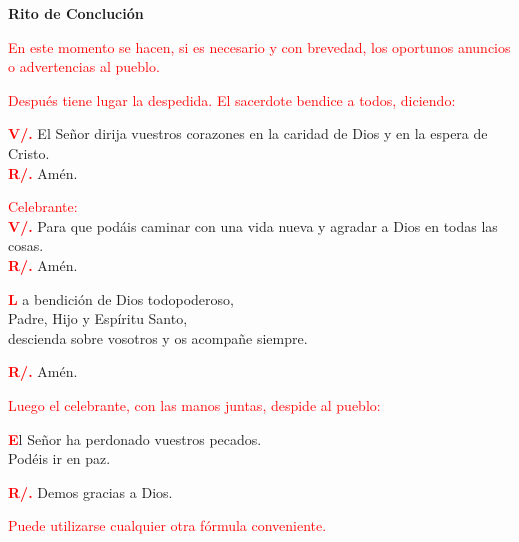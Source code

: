 \documentclass[12pt, letterpaper]{report}
\begin{document}
\begin{center}
\Huge {\bfseries Rito de Concluci\'on}
\end{center}

\large{\textcolor{red}{En este momento se hacen, si es necesario y con brevedad, los oportunos anuncios o advertencias al pueblo.}}

\large{\textcolor{red}{Despu\'es tiene lugar la despedida. El sacerdote bendice a todos, diciendo:}}

\noindent
\Large {\bfseries \textcolor{red}{V/.}} \hspace{0.5cm} El Se\~nor dirija vuestros corazones en la caridad de Dios y en la espera de Cristo.\\
\noindent
\Large {\bfseries \textcolor{red}{R/.}} \hspace{0.5cm} Am\'en.

\large{\textcolor{red}{Celebrante:}}\\
\Large {\bfseries \textcolor{red}{V/.}} \hspace{0.5cm} Para que pod\'ais caminar con una vida nueva y agradar a Dios en todas las cosas.\\
\noindent
\Large {\bfseries \textcolor{red}{R/.}} \hspace{0.5cm} Am\'en.

\lettrine[lines=2]{\bfseries \textcolor{red}{L}}{} \Large a bendici\'on de Dios todopoderoso, \\
Padre, Hijo \Huge{\textcolor{red}{}} \Large y Esp\'iritu Santo, \\
descienda sobre vosotros y os acompa\~ne siempre.

\noindent
\Large {\bfseries \textcolor{red}{R/.}} \hspace{0.5cm} Am\'en.

\large{\textcolor{red}{Luego el celebrante, con las manos juntas, despide al pueblo:}}

\lettrine[lines=2]{\bfseries \textcolor{red}{E}}{}\Large l Se\~nor ha perdonado vuestros pecados.\\
Pod\'eis ir en paz.

\noindent
\Large {\bfseries \textcolor{red}{R/.}} \hspace{0.5cm} Demos gracias a Dios.

\large{\textcolor{red}{Puede utilizarse cualquier otra f\'ormula conveniente.}}

\end{document}
